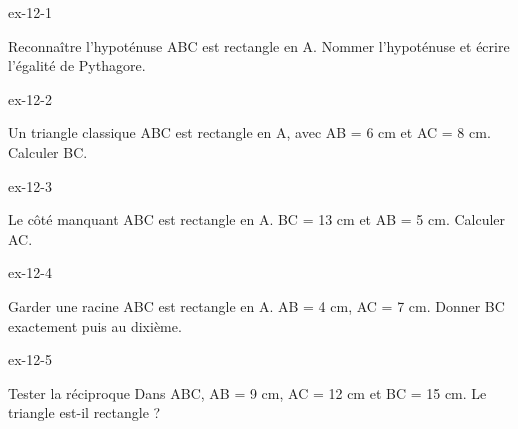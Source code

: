 \clearpage{}
\begin{blocLivre}{ex-12-1}\begin{exercice}[1]{Reconnaître l’hypoténuse}
ABC est rectangle en A. Nommer l’hypoténuse et écrire l’égalité de Pythagore.
\label{fig-ex-12-1}
\end{exercice}\end{blocLivre}
\begin{blocLivre}{ex-12-2}\begin{exercice}[1]{Un triangle classique}
ABC est rectangle en A, avec AB = 6 cm et AC = 8 cm. Calculer BC.
\label{fig-ex-12-2}
\end{exercice}\end{blocLivre}
\begin{blocLivre}{ex-12-3}\begin{exercice}[1]{Le côté manquant}
ABC est rectangle en A. BC = 13 cm et AB = 5 cm. Calculer AC.
\label{fig-ex-12-3}
\end{exercice}\end{blocLivre}
\begin{blocLivre}{ex-12-4}\begin{exercice}[1]{Garder une racine}
ABC est rectangle en A. AB = 4 cm, AC = 7 cm. Donner BC exactement puis au dixième.
\label{fig-ex-12-4}
\end{exercice}\end{blocLivre}
\begin{blocLivre}{ex-12-5}\begin{exercice}[1]{Tester la réciproque}
Dans ABC, AB = 9 cm, AC = 12 cm et BC = 15 cm. Le triangle est-il rectangle ?
\label{fig-ex-12-5}
\end{exercice}\end{blocLivre}

